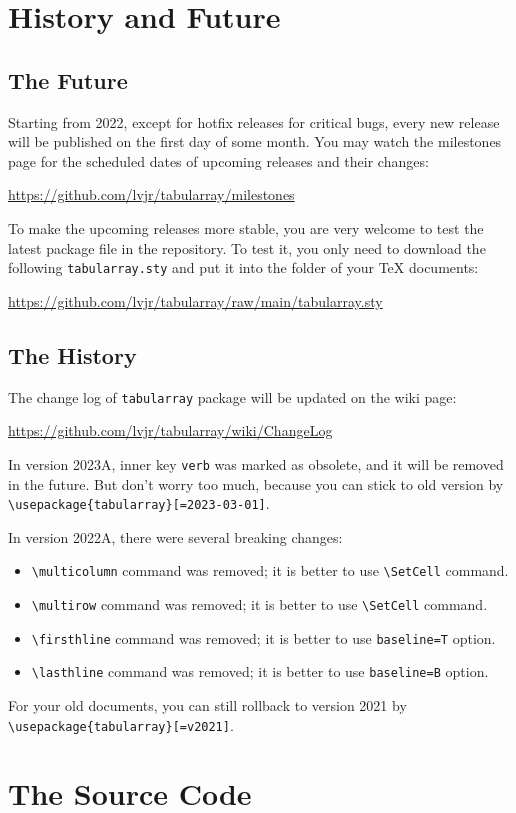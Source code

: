 \documentclass[oneside]{book}
\begin{document}
\chapter{History and Future}

\section{The Future}

Starting from 2022, except for hotfix releases for critical bugs,
every new release will be published on the first day of some month.
You may watch the milestones page for the scheduled dates of upcoming releases
and their changes:\newline
\centerline{\url{https://github.com/lvjr/tabularray/milestones}}

To make the upcoming releases more stable, you are very welcome to test the latest package file
in the repository. To test it, you only need to download the following \verb!tabularray.sty!
and put it into the folder of your TeX documents:\newline
\centerline{\url{https://github.com/lvjr/tabularray/raw/main/tabularray.sty}}

\section{The History}

The change log of \verb!tabularray! package will be updated on the wiki page:\newline
\centerline{\url{https://github.com/lvjr/tabularray/wiki/ChangeLog}}

In version 2023A, inner key \verb!verb! was marked as obsolete,
and it will be removed in the future. But don't worry too much,
because you can stick to old version by \verb!\usepackage{tabularray}[=2023-03-01]!.

In version 2022A, there were several breaking changes:

\begin{itemize}[nosep]
\item \verb!\multicolumn! command was removed; it is better to use \verb!\SetCell! command.
\item \verb!\multirow! command was removed; it is better to use \verb!\SetCell! command.
\item \verb!\firsthline! command was removed; it is better to use \verb!baseline=T! option.
\item \verb!\lasthline! command was removed; it is better to use \verb!baseline=B! option.
\end{itemize}

For your old documents, you can still rollback to version 2021 by \verb!\usepackage{tabularray}[=v2021]!.

\chapter{The Source Code}

\end{document}
